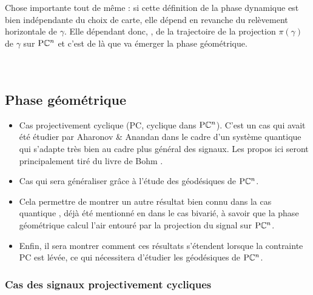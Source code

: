 Chose importante tout de même : si cette définition de la phase dynamique est bien indépendante du choix de carte, elle dépend en revanche du relèvement horizontale de $\gamma$. Elle dépendant donc, \afortiori, de la trajectoire de la projection $\pi(\gamma)$ de $\gamma$ sur $\text{\normalfont P}\mathbb{C}^{n}$ et c'est de là que va émerger la phase géométrique.
\\
\\
\\



\subsection{Phase géométrique}

\begin{itemize}
	\item Cas projectivement cyclique (PC, cyclique dans $\text{\normalfont P}\mathbb{C}^{n}$). C'est un cas qui avait été étudier par Aharonov \& Anandan dans le cadre d'un système quantique qui s'adapte très bien au cadre plus général des signaux. Les propos ici seront principalement tiré du livre de Bohm \cite{bohm_geometric_2003}.
	
	\item Cas qui sera généraliser grâce à l'étude des géodésiques de $\text{\normalfont P}\mathbb{C}^{n}$.
	
	\item Cela permettre de montrer un autre résultat bien connu dans la cas quantique \cite{chruscinski_geometric_2004}, déjà été mentionné en dans le cas bivarié, à savoir que la phase géométrique calcul l'air entouré par la projection du signal sur $\text{\normalfont P}\mathbb{C}^{n}$.
	
	\item Enfin, il sera montrer comment ces résultats s'étendent lorsque la contrainte PC est lévée, ce qui nécessitera d'étudier les géodésiques de $\text{\normalfont P}\mathbb{C}^{n}$.
\end{itemize}
\skipl



\subsubsection{Cas des signaux projectivement cycliques}

